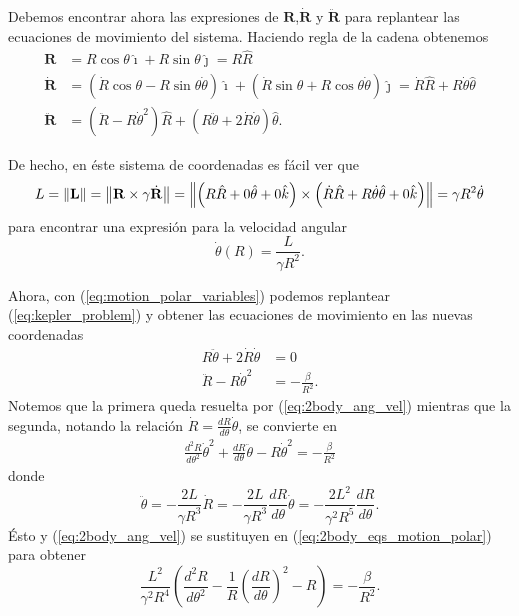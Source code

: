 Debemos encontrar ahora las expresiones de $\mathbf{R}$,$\dot{\mathbf{R}}$ y $\ddot{\mathbf{R}}$ para replantear las ecuaciones de movimiento del sistema. Haciendo regla de la cadena obtenemos
\begin{align}
 \mathbf{R} &= R \cos \theta \hat{\imath} + R \sin \theta \hat{\jmath} = R \hat{R} \\
 \dot{\mathbf{R}} &= \left( \dot{R} \cos \theta - R \sin \theta \dot{\theta} \right) \hat{\imath} + \left( \dot{R} \sin \theta + R \cos \theta \dot{\theta} \right) \hat{\jmath} = \dot{R}\hat{R} + R \dot{\theta} \hat{\theta} \\
 \ddot{\mathbf{R}} &= \left(\ddot{R} - R \dot{\theta}^2 \right) \hat{R} + \left( R \ddot{\theta} + 2 \dot{R}\dot{\theta} \right) \hat{\theta}.
 \label{eq:motion_polar_variables}
\end{align}

De hecho, en éste sistema de coordenadas es fácil ver que
\begin{equation}
 L = \left\lVert \mathbf{L} \right\rVert = \left\lVert \mathbf{R} \times \gamma \dot{\mathbf{R}} \right\rVert = \left\lVert \left( R \hat{R} + 0 \hat{\theta} + 0 \hat{k} \right) \times \left( \dot{R} \hat{R} + R \dot{\theta} \hat{\theta} + 0\hat{k} \right) \right\rVert = \gamma R^2 \dot{\theta}
\end{equation}
para encontrar una expresión para la velocidad angular 
\begin{equation}
\dot{\theta}(R) = \frac{L}{\gamma R^2}.
\label{eq:2body_ang_vel}
\end{equation}

Ahora, con (\ref{eq:motion_polar_variables}) podemos replantear (\ref{eq:kepler_problem}) y obtener las ecuaciones de movimiento en las nuevas coordenadas
\begin{align}
 R \ddot{\theta} + 2 \dot{R} \dot{\theta} &= 0 \\
 \ddot{R} - R \dot{\theta}^2 &= -\frac{\beta}{R^2}.
 \label{eq:2body_eqs_motion_polar}
\end{align}
Notemos que la primera queda resuelta por (\ref{eq:2body_ang_vel}) mientras que la segunda, notando la relación $\dot{R} = \frac{d R}{d\theta} \dot{\theta}$, se convierte en
\begin{align*}
 \frac{d^2 R}{d \theta^2} \dot{\theta}^2 + \frac{dR}{d\theta} \ddot{\theta} - R \dot{\theta}^2 = - \frac{\beta}{R^2}
\end{align*}
donde 
\begin{equation*}
 \ddot{\theta} = -\frac{2L}{\gamma R^3}\dot{R} = -\frac{2L}{\gamma R^3} \frac{dR}{d\theta}\dot{\theta} = - \frac{2L^2}{\gamma^2 R^5} \frac{dR}{d\theta}.
\end{equation*}
Ésto y (\ref{eq:2body_ang_vel}) se sustituyen en  (\ref{eq:2body_eqs_motion_polar}) para obtener
\begin{equation*}
 \frac{L^2}{\gamma^2 R^4}\left( \frac{d^2R}{d\theta^2} - \frac{1}{R} \left(\frac{dR}{d\theta} \right)^2 -R \right) = - \frac{\beta}{R^2}.
\end{equation*}

